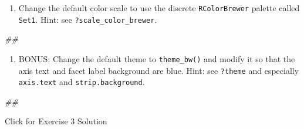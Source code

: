 \documentclass[
]{book}
\newenvironment{Shaded}{\begin{snugshade}}{\end{snugshade}}
\newcommand{\CommentTok}[1]{\textcolor[rgb]{0.56,0.35,0.01}{\textit{#1}}}
\providecommand{\tightlist}{%
  \setlength{\itemsep}{0pt}\setlength{\parskip}{0pt}}
\begin{document}
\begin{enumerate}
\def\labelenumi{\arabic{enumi}.}
\setcounter{enumi}{4}
\tightlist
\item
  Change the default color scale to use the discrete \texttt{RColorBrewer} palette called \texttt{Set1}. Hint: see \texttt{?scale\_color\_brewer}.
\end{enumerate}

\begin{Shaded}
\begin{Highlighting}[]
\CommentTok{\#\# }
\end{Highlighting}
\end{Shaded}

\begin{enumerate}
\def\labelenumi{\arabic{enumi}.}
\setcounter{enumi}{5}
\tightlist
\item
  BONUS: Change the default theme to \texttt{theme\_bw()} and modify it so that the axis text and facet label background are blue. Hint: see \texttt{?theme} and especially \texttt{axis.text} and \texttt{strip.background}.
\end{enumerate}

\begin{Shaded}
\begin{Highlighting}[]
\CommentTok{\#\# }
\end{Highlighting}
\end{Shaded}

{Click for Exercise 3 Solution}
\end{document}
